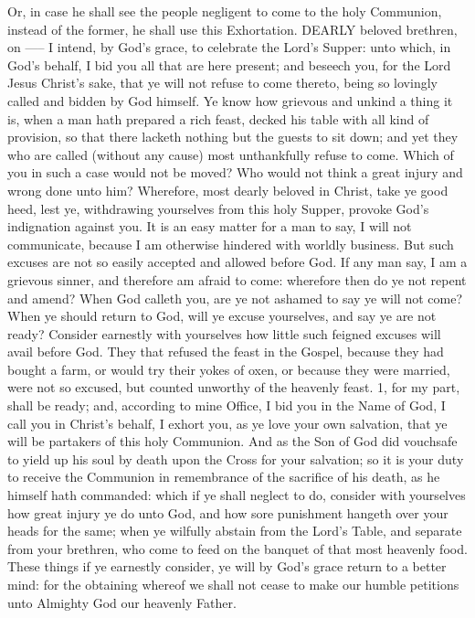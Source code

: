 Or, in case he shall see the people negligent to come to the holy Communion, instead of the former, he shall use this Exhortation.
DEARLY beloved brethren, on ----- I intend, by God's grace, to celebrate the Lord's Supper: unto which, in God's behalf, I bid you all that are here present; and beseech you, for the Lord Jesus Christ's sake, that ye will not refuse to come thereto, being so lovingly called and bidden by God himself. Ye know how grievous and unkind a thing it is, when a man hath prepared a rich feast, decked his table with all kind of provision, so that there lacketh nothing but the guests to sit down; and yet they who are called (without any cause) most unthankfully refuse to come. Which of you in such a case would not be moved? Who would not think a great injury and wrong done unto him? Wherefore, most dearly beloved in Christ, take ye good heed, lest ye, withdrawing yourselves from this holy Supper, provoke God's indignation against you. It is an easy matter for a man to say, I will not communicate, because I am otherwise hindered with worldly business. But such excuses are not so easily accepted and allowed before God. If any man say, I am a grievous sinner, and therefore am afraid to come: wherefore then do ye not repent and amend? When God calleth you, are ye not ashamed to say ye will not come? When ye should return to God, will ye excuse yourselves, and say ye are not ready? Consider earnestly with yourselves how little such feigned excuses will avail before God. They that refused the feast in the Gospel, because they had bought a farm, or would try their yokes of oxen, or because they were married, were not so excused, but counted unworthy of the heavenly feast. 1, for my part, shall be ready; and, according to mine Office, I bid you in the Name of God, I call you in Christ's behalf, I exhort you, as ye love your own salvation, that ye will be partakers of this holy Communion. And as the Son of God did vouchsafe to yield up his soul by death upon the Cross for your salvation; so it is your duty to receive the Communion in remembrance of the sacrifice of his death, as he himself hath commanded: which if ye shall neglect to do, consider with yourselves how great injury ye do unto God, and how sore punishment hangeth over your heads for the same; when ye wilfully abstain from the Lord's Table, and separate from your brethren, who come to feed on the banquet of that most heavenly food. These things if ye earnestly consider, ye will by God's grace return to a better mind: for the obtaining whereof we shall not cease to make our humble petitions unto Almighty God our heavenly Father.

